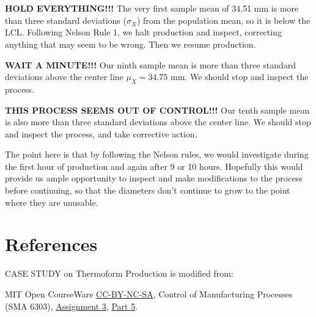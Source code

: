 \documentclass{ximera}
\begin{document}

\textbf{HOLD EVERYTHING!!!}  The very first sample mean of 34.51 mm is more than three standard deviations ($\sigma_{\bar{X}}$) from the population mean, so it is below the LCL.  %
Following Nelson Rule 1, we halt production and inspect, correcting anything that may seem to be wrong.  Then we resume production.

\textbf{WAIT A MINUTE!!!}  Our ninth sample mean is more than three standard deviations above the center line $\mu_{\bar{X}}=34.75$ mm.  We should stop and inspect the process.

\textbf{THIS PROCESS SEEMS OUT OF CONTROL!!!}  Our tenth sample mean is also more than three standard deviations above the center line.  We should stop and inspect the process, and take corrective action.

The point here is that by following the Nelson rules, we would investigate during the first hour of production and again after 9 or 10 hours.  Hopefully this would provide us ample opportunity to inspect and make modifications to the process before continuing, so that the diameters don't continue to grow to the point where they are unusable.







\section*{References}
CASE STUDY on Thermoform Production is modified from:

MIT Open CourseWare \href{https://creativecommons.org/licenses/by-nc-sa/4.0/}{CC-BY-NC-SA}, Control of Manufacturing Processes (SMA 6303), \href{https://ocw.mit.edu/courses/2-830j-control-of-manufacturing-processes-sma-6303-spring-2008/resources/ps3/}{Assignment 3}, \href{https://ocw.mit.edu/courses/2-830j-control-of-manufacturing-processes-sma-6303-spring-2008/resources/35/}{Part 5}. 
\end{document}
